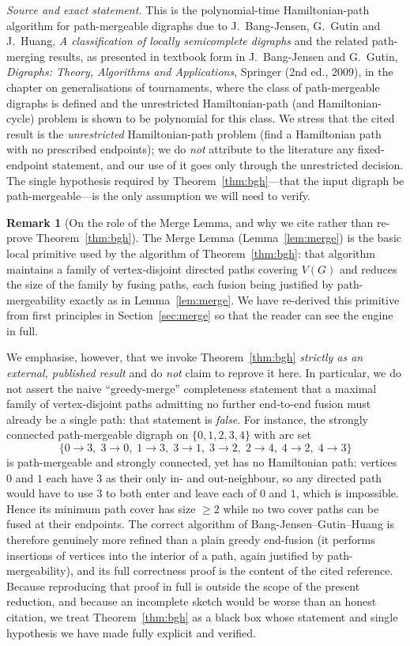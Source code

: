 \documentclass[12pt]{article}
\theoremstyle{definition}
\newtheorem{remark}{Remark}
\begin{document}
\noindent\emph{Source and exact statement.} This is the polynomial-time
Hamiltonian-path algorithm for path-mergeable digraphs due to J.~Bang-Jensen,
G.~Gutin and J.~Huang, \emph{A classification of locally semicomplete digraphs}
and the related path-merging results, as presented in textbook form in
J.~Bang-Jensen and G.~Gutin, \emph{Digraphs: Theory, Algorithms and
Applications}, Springer (2nd ed., 2009), in the chapter on generalisations of
tournaments, where the class of path-mergeable digraphs is defined and the
unrestricted Hamiltonian-path (and Hamiltonian-cycle) problem is shown to be
polynomial for this class. We stress that the cited result is the
\emph{unrestricted} Hamiltonian-path problem (find a Hamiltonian path with no
prescribed endpoints); we do \emph{not} attribute to the literature any
fixed-endpoint statement, and our use of it goes only through the unrestricted
decision. The single hypothesis required by Theorem~\ref{thm:bgh}---that the input
digraph be path-mergeable---is the only assumption we will need to verify.

\begin{remark}[On the role of the Merge Lemma, and why we cite rather than re-prove
Theorem~\ref{thm:bgh}]\label{rem:engine}
The Merge Lemma (Lemma~\ref{lem:merge}) is the basic local primitive used by the
algorithm of Theorem~\ref{thm:bgh}: that algorithm maintains a family of
vertex-disjoint directed paths covering $V(G)$ and reduces the size of the family by
fusing paths, each fusion being justified by path-mergeability exactly as in
Lemma~\ref{lem:merge}. We have re-derived this primitive from first principles in
Section~\ref{sec:merge} so that the reader can see the engine in full.

We emphasise, however, that we invoke Theorem~\ref{thm:bgh} \emph{strictly as an
external, published result} and do \emph{not} claim to reprove it here. In
particular, we do not assert the naive ``greedy-merge'' completeness statement that
a maximal family of vertex-disjoint paths admitting no further end-to-end fusion
must already be a single path: that statement is \emph{false}. For instance, the
strongly connected path-mergeable digraph on $\{0,1,2,3,4\}$ with arc set
\[
\{0\!\to\!3,\;3\!\to\!0,\;1\!\to\!3,\;3\!\to\!1,\;3\!\to\!2,\;2\!\to\!4,\;4\!\to\!2,\;4\!\to\!3\}
\]
is path-mergeable and strongly connected, yet has no Hamiltonian path: vertices $0$
and $1$ each have $3$ as their only in- and out-neighbour, so any directed path
would have to use $3$ to both enter and leave each of $0$ and $1$, which is
impossible. Hence its minimum path cover has size $\ge 2$ while no two cover paths
can be fused at their endpoints. The correct algorithm of
Bang-Jensen--Gutin--Huang is therefore genuinely more refined than a plain greedy
end-fusion (it performs insertions of vertices into the interior of a path, again
justified by path-mergeability), and its full correctness proof is the content of
the cited reference. Because reproducing that proof in full is outside the scope of
the present reduction, and because an incomplete sketch would be worse than an
honest citation, we treat Theorem~\ref{thm:bgh} as a black box whose statement and
single hypothesis we have made fully explicit and verified.
\end{remark}
\end{document}
